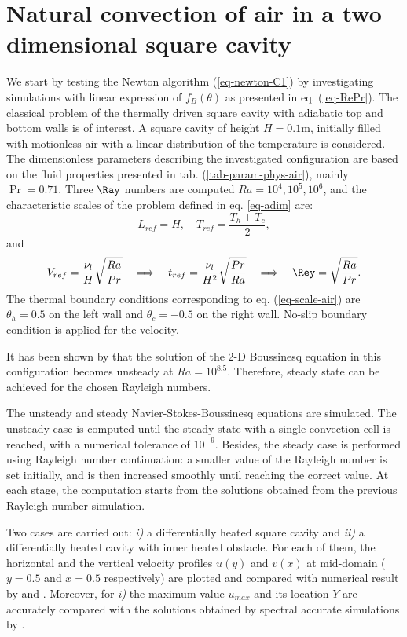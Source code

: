 \section{Natural convection of air in a two dimensional square cavity}\label{sec: natconv-air-2D}
We start by testing the Newton algorithm (\ref{eq-newton-C1}) by investigating simulations with linear expression of $f_B(\theta)$ as presented in eq. (\ref{eq-RePr}).
The classical problem of the thermally driven square cavity with adiabatic top and bottom walls is of interest.
A square cavity of height $H = 0.1$m, initially filled with motionless air with a linear distribution of the temperature is considered. 
The dimensionless parameters describing the investigated configuration are based on the fluid properties presented in tab. (\ref{tab-param-phys-air}), mainly $\Pr = 0.71$.
Three $\Ray$ numbers are computed $Ra = 10^4, 10^5, 10^6$, and
the characteristic scales of the problem defined in eq. \ref{eq-adim} are:
\begin{equation} \label{eq-scale-air}
	L_{ref} = H, \quad T_{ref} = \frac{T_h + T_c}{2},
\end{equation}
and
\begin{equation}
   V_{ref} = \frac{\nu_l}{H} \sqrt{\frac{Ra}{Pr}} 
   \quad \Longrightarrow \quad t_{ref} = \frac{\nu_l}{H^2} \sqrt{\frac{Pr}{Ra}} 
   \quad \Longrightarrow \quad \Rey = \sqrt{\frac{Ra}{Pr}}.
\end{equation} 
The thermal boundary conditions corresponding to eq. (\ref{eq-scale-air}) are $\theta_h = 0.5$ on the left wall and $\theta_c = -0.5$ on the right wall. 
No-slip boundary condition is applied for the velocity.

It has been shown by \cite{LeQuere91} that the solution of the 2-D Boussinesq equation in this configuration becomes unsteady at $Ra = 10^{8.5}$.
Therefore, steady state can be achieved for the chosen Rayleigh numbers.

The unsteady and steady Navier-Stokes-Boussinesq equations are simulated.
The unsteady case is computed until the steady state with a single convection cell is reached, with a numerical tolerance of $10^{-9}$.
Besides, the steady case is performed using Rayleigh number continuation:
a smaller value of the Rayleigh number is set initially, and is then increased smoothly until reaching the correct value.
At each stage, the computation starts from the solutions obtained from the previous Rayleigh number simulation.

Two cases are carried out: {\it i)} a differentially heated square cavity and {\it ii)} a differentially heated cavity with inner heated obstacle.
For each of them, the horizontal and the vertical velocity profiles $u(y)$ and $v(x)$ at mid-domain ($y=0.5$ and $x=0.5$ respectively) are plotted and compared with numerical result by \cite{LeQuere91} and \cite{Raluca2013}. 
Moreover, for {\it i)} the maximum value $u_{max}$ and its location $Y$ are accurately compared with the solutions obtained by spectral accurate simulations by \cite{LeQuere91}.

